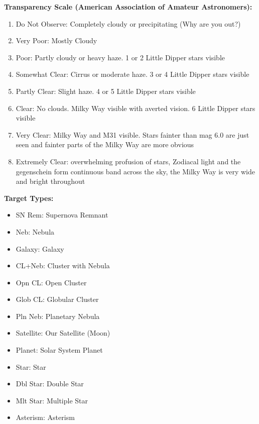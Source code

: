 \documentclass[10pt,twoside,a4paper,english]{article}
\begin{document}
\bigskip      
{\bf Transparency Scale (American Association of Amateur Astronomers):} 
\begin{enumerate} 
\item Do Not Observe: Completely cloudy or precipitating (Why are you out?) 
\item Very Poor: Mostly Cloudy 
\item Poor: Partly cloudy or heavy haze. 1 or 2 Little Dipper stars visible 
\item Somewhat Clear: Cirrus or moderate haze. 3 or 4 Little Dipper stars visible 
\item Partly Clear: Slight haze. 4 or 5 Little Dipper stars visible 
\item Clear: No clouds. Milky Way visible with averted vision. 6 Little Dipper stars visible 
\item Very Clear: Milky Way and M31 visible. Stars fainter than mag 6.0 are just seen and fainter parts of the Milky Way are more obvious  
\item Extremely Clear: overwhelming profusion of stars, Zodiacal light and the gegenschein form continuous band across the sky, the Milky Way is very wide and bright throughout 
\end{enumerate} 
 
\bigskip 
{\bf Target Types:} 
\begin{itemize} 
\renewcommand\labelitemi{--} 
\item SN Rem: Supernova Remnant 
\item Neb: Nebula 
\item Galaxy: Galaxy 
\item CL+Neb: Cluster with Nebula 
\item Opn CL: Open Cluster 
\item Glob CL: Globular Cluster 
\item Pln Neb: Planetary Nebula 
\item Satellite: Our Satellite (Moon) 
\item Planet: Solar System Planet 
\item Star: Star 
\item Dbl Star: Double Star 
\item Mlt Star: Multiple Star 
\item Asterism: Asterism 
\end{itemize} 
 
\clearpage 
 
 
\normalsize 
\end{document}
